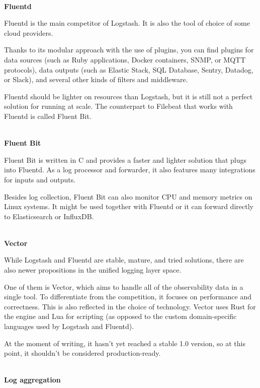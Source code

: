 \hspace*{\fill} \\ %
\noindent
\textbf{Fluentd}

Fluentd is the main competitor of Logstash. It is also the tool of choice of some cloud providers.

Thanks to its modular approach with the use of plugins, you can find plugins for data sources (such as Ruby applications, Docker containers, SNMP, or MQTT protocols), data outputs (such as Elastic Stack, SQL Database, Sentry, Datadog, or Slack), and several other kinds of filters and middleware.

Fluentd should be lighter on resources than Logstash, but it is still not a perfect solution for running at scale. The counterpart to Filebeat that works with Fluentd is called Fluent Bit.

\hspace*{\fill} \\ %
\noindent
\textbf{Fluent Bit}

Fluent Bit is written in C and provides a faster and lighter solution that plugs into Fluentd. As a log processor and forwarder, it also features many integrations for inputs and outputs.

Besides log collection, Fluent Bit can also monitor CPU and memory metrics on Linux systems. It might be used together with Fluentd or it can forward directly to Elasticsearch or InfluxDB.

\hspace*{\fill} \\ %
\noindent
\textbf{Vector}

While Logstash and Fluentd are stable, mature, and tried solutions, there are also newer propositions in the unified logging layer space.

One of them is Vector, which aims to handle all of the observability data in a single tool. To differentiate from the competition, it focuses on performance and correctness. This is also reflected in the choice of technology. Vector uses Rust for the engine and Lua for scripting (as opposed to the custom domain-specific languages used by Logstash and Fluentd).

At the moment of writing, it hasn't yet reached a stable 1.0 version, so at this point, it shouldn't be considered production-ready.

\hspace*{\fill} \\ %
\noindent
\textbf{Log aggregation}

